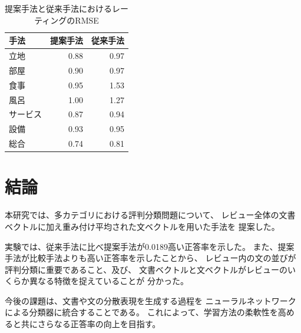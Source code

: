 \documentclass{ttithesis}
\begin{document}
\begin{table}[b!]
  \caption{提案手法と従来手法\cite{fujitani15}におけるレーティングのRMSE}
  \centering
  \begin{tabular}{l | r r} \label{tab:RMSEs}
    手法 & 提案手法 & 従来手法\cite{fujitani15} \\
    \hline
    立地      & 0.88 & 0.97 \\
    部屋      & 0.90 & 0.97 \\
    食事      & 0.95 & 1.53 \\
    風呂      & 1.00 & 1.27 \\
    サービス  & 0.87 & 0.94 \\
    設備      & 0.93 & 0.95 \\
    総合      & 0.74 & 0.81 \\
  \end{tabular}
\end{table}



\section{結論}

本研究では、多カテゴリにおける評判分類問題について、
レビュー全体の文書ベクトルに加え重み付け平均された文ベクトルを用いた手法を
提案した。

実験では、従来手法\cite{fujitani15}に比べ提案手法が0.0189高い正答率を示した。
また、提案手法が比較手法よりも高い正答率を示したことから、
レビュー内の文の並びが評判分類に重要であること、及び、
文書ベクトルと文ベクトルがレビューのいくらか異なる特徴を捉えていることが
分かった。

今後の課題は、文書や文の分散表現を生成する過程を
ニューラルネットワークによる分類器に統合することである。
これによって、学習方法の柔軟性を高めると共にさらなる正答率の向上を目指す。

%
%
\end{document}
